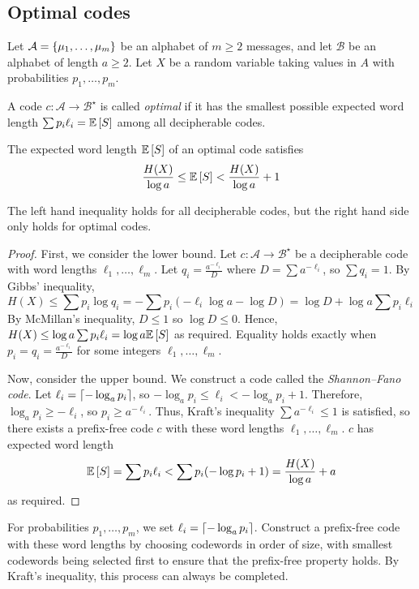 \subsection{Optimal codes}
Let \( \mathcal A = \qty{\mu_1, \dots, \mu_m} \) be an alphabet of \( m \geq 2 \) messages, and let \( \mathcal B \) be an alphabet of length \( a \geq 2 \).
Let \( X \) be a random variable taking values in \( A \) with probabilities \( p_1, \dots, p_m \).
\begin{definition}
    A code \( c \colon \mathcal A \to \mathcal B^\star \) is called \emph{optimal} if it has the smallest possible expected word length \( \sum p_i \ell_i = \mathbb{E}\left[{S}\right] \) among all decipherable codes.
\end{definition}
\begin{theorem}
    The expected word length \( \mathbb{E}\left[{S}\right] \) of an optimal code satisfies
    \[ \frac{H(X)}{\log a} \leq \mathbb{E}\left[{S}\right] < \frac{H(X)}{\log a} + 1 \]
\end{theorem}
The left hand inequality holds for all decipherable codes, but the right hand side only holds for optimal codes.
\begin{proof}
    First, we consider the lower bound.
    Let \( c \colon \mathcal A \to \mathcal B^\star \) be a decipherable code with word lengths \( \ell_1, \dots, \ell_m \).
    Let \( q_i = \frac{a^{-\ell_i}}{D} \) where \( D = \sum a^{-\ell_i} \), so \( \sum q_i = 1 \).
    By Gibbs' inequality,
    \[ H(X) \leq \sum p_i \log q_i = -\sum p_i(-\ell_i \log a - \log D) = \log D + \log a \sum p_i \ell_i \]
    By McMillan's inequality, \( D \leq 1 \) so \( \log D \leq 0 \).
    Hence, \( H(X) \leq \log a \sum p_i \ell_i = \log a \mathbb{E}\left[{S}\right] \) as required.
    Equality holds exactly when \( p_i = q_i = \frac{a^{-\ell_i}}{D} \) for some integers \( \ell_1, \dots, \ell_m \).

    Now, consider the upper bound.
    We construct a code called the \emph{Shannon--Fano code}.
    Let \( \ell_i = \lceil-\log_a p_i\rceil \), so \( -\log_a p_i \leq \ell_i < -\log_a p_i + 1 \).
    Therefore, \( \log_a p_i \geq -\ell_i \), so \( p_i \geq a^{-\ell_i} \).
    Thus, Kraft's inequality \( \sum a^{-\ell_i} \leq 1 \) is satisfied, so there exists a prefix-free code \( c \) with these word lengths \( \ell_1, \dots, \ell_m \).
    \( c \) has expected word length
    \[ \mathbb{E}\left[{S}\right] = \sum p_i \ell_i < \sum p_i (-\log p_i + 1) = \frac{H(X)}{\log a} + a \]
    as required.
\end{proof}
\begin{example}
    For probabilities \( p_1, \dots, p_m \), we set \( \ell_i = \lceil-\log_a p_i\rceil \).
    Construct a prefix-free code with these word lengths by choosing codewords in order of size, with smallest codewords being selected first to ensure that the prefix-free property holds.
    By Kraft's inequality, this process can always be completed.
\end{example}
